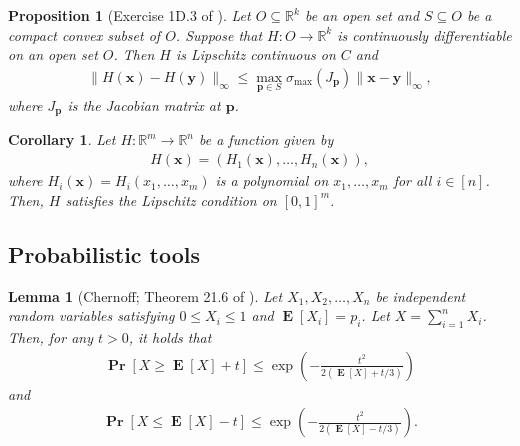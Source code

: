 \documentclass[letterpaper,11pt]{article}
\newtheorem{lemma}[theorem]{Lemma}
\newtheorem{corollary}[theorem]{Corollary}
\newtheorem{proposition}[theorem]{Proposition}
\renewcommand\Pr{\mathop{\mathbf{Pr}}}
\DeclareMathOperator{\E}{\mathbf{E}}
\begin{document}
\begin{proposition}[Exercise 1D.3 of \cite{DR14}]  \label{prop:lipschitzC1prop}
Let $O\subseteq \mathbb{R}^k$ be an open set and $S\subseteq O$ be a compact convex subset of $O$.
Suppose that $H:O\to \mathbb{R}^k$ is continuously differentiable on an open set $O$.
Then $H$ is Lipschitz continuous on $C$ and
\begin{align*}
\|H(\mathbf{x})-H(\mathbf{y})\|_\infty \leq \max_{\mathbf{p}\in S}\sigma_{\max}(J_{\mathbf{p}})\|\mathbf{x}-\mathbf{y}\|_\infty,
\end{align*}
where $J_{\mathbf{p}}$ is the Jacobian matrix at $\mathbf{p}$.

\end{proposition}

\begin{corollary} \label{cor:lipschitzprop}
Let $H:\mathbb{R}^m\to\mathbb{R}^n$ be a function given by
\begin{align*}
H(\mathbf{x})=(H_1(\mathbf{x}),\ldots,H_n(\mathbf{x})),
\end{align*}
where $H_i(\mathbf{x})=H_i(x_1,\ldots,x_m)$ is a polynomial on $x_1,\ldots,x_m$ for all $i\in[n]$.
Then, $H$ satisfies the Lipschitz condition on $[0,1]^m$.
\end{corollary}




\subsection{Probabilistic tools}
\begin{lemma} [Chernoff; Theorem 21.6 of \cite{FK16}] \label{lem:chernoffbound1}
Let $X_1, X_2, \ldots, X_n$ be independent random variables satisfying $0\leq X_i\leq 1$ and $\E[X_i]=p_i$.
Let $X=\sum_{i=1}^nX_i$.
Then, for any $t>0$, it holds that
\begin{align*}
\Pr[X\geq \E[X]+t]\leq \exp\left(-\frac{t^2}{2(\E[X]+t/3)}\right)
\end{align*}
and
\begin{align*}
\Pr[X\leq \E[X]-t]\leq \exp\left(-\frac{t^2}{2(\E[X]-t/3)}\right).
\end{align*}
\end{lemma}
\fi
\end{document}
